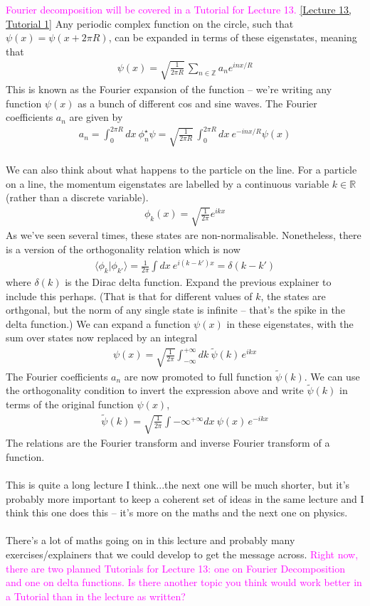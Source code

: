 \documentclass[12pt]{article}
\def\be{\begin{eqnarray}}
\def\ee{\end{eqnarray}}
\newcommand{\nn}{\nonumber}
\newcommand\para{\paragraph{}}
\newcommand{\bra}[1]{\langle#1|}
\newcommand{\co}{\color{olive}}
\newcommand{\cblue}{\color{blue}}
\newcommand{\cred}{\color{red}}
\newcommand{\Z}{{\mathds Z}}
\newcommand{\R}{{\mathds R}}
\newcommand{\alyssa}{\textcolor{magenta}}
\begin{document}
{\alyssa{Fourier decomposition will be covered in a Tutorial for Lecture 13.} \href{https://drive.google.com/file/d/1n-YQ8dFd1MKPnm-bguGlogegpUygVlsI/view?usp=drive_link}{[Lecture 13, Tutorial 1]}
{\co Any periodic complex function on the circle, such that $\psi(x) = \psi(x+2\pi R)$, can be expanded in terms of these eigenstates, meaning that
%
\be \psi(x) = \sqrt{\frac{1}{2\pi R}}\, \sum_{n\in \Z}a_n e^{inx/R}\nn\ee
%
This is known as the Fourier expansion of the function} -- we're writing any function $\psi(x)$ as a bunch of different cos and sine waves.  {\co The Fourier coefficients $a_n$ are given by 
%
\be a_n = \int_0^{2\pi R} dx\ \phi_n^\star\psi = \sqrt{\frac{1}{2\pi R}}\,\int_0^{2\pi R} dx\ e^{-inx/R}\psi(x)\nn\ee
%
}

\para
We can also think about what happens to the particle on the line. {\co For a particle on a line, the momentum eigenstates are labelled by a continuous variable $k\in \R$} (rather than a discrete variable). {\co 
%
\be \phi_k(x) = \sqrt{\frac{1}{2\pi}} e^{ikx}\nn\ee
%
As we've seen several times, these states  are non-normalisable. Nonetheless, there is a version of the orthogonality relation  which is now
%
\be \bra{\phi_k}{\phi_{k'}}\rangle = \frac{1}{2\pi} \int dx\ e^{i(k-k')x} = \delta(k-k')\nn\ee
%
where $\delta(k)$ is the Dirac delta function. } {\cblue Expand the previous explainer to include this perhaps}. (That is that for different values of $k$, the states are orthgonal, but the norm of any single state is infinite -- that's the spike in the delta function.)  {\co We can expand a function $\psi(x)$ in these eigenstates, with the sum over states now replaced by an integral
%
\be \psi(x) = \sqrt{\frac{1}{2\pi}} \int_{-\infty}^{+\infty} dk\ \tilde{\psi}(k)\,e^{ikx}\nn\ee
%
The Fourier coefficients $a_n$ are now promoted to full function $\tilde{\psi}(k)$. We can use the orthogonality condition to invert the expression above and write $\tilde{\psi}(k)$ in terms of the original function $\psi(x)$, 
%
\be \tilde{\psi}(k) =  \sqrt{\frac{1}{2\pi}} \int{-\infty}^{+\infty} dx\ {\psi}(x)\,e^{-ikx}\nn\ee
%
The relations are the Fourier transform and inverse Fourier transform of  a function.}


\para
{\cred This is quite a long lecture I think...the next one will be much shorter, but it's probably more important to keep a coherent set of ideas in the same lecture and I think this one does this -- it's more on the maths and the next one on physics.}

\para
{\cblue There's a lot of maths going on in this lecture and probably many exercises/explainers that we could develop to get the message across.} \alyssa{Right now, there are two planned Tutorials for Lecture 13: one on Fourier Decomposition and one on delta functions. Is there another topic you think would work better in a Tutorial than in the lecture as written?}


}
\end{document}
